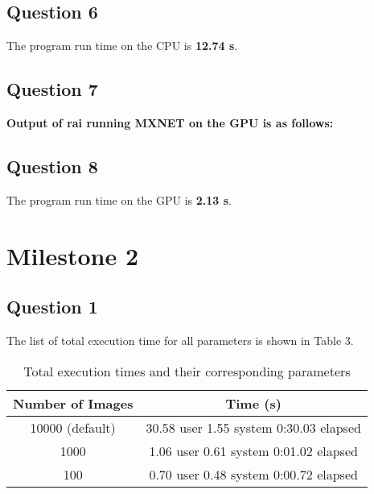 \documentclass[12pt,titlepage]{article}
\begin{document}
\subsection*{Question 6}
The program run time on the CPU is \textbf{12.74 s}.


\subsection*{Question 7}
\textbf{Output of rai running MXNET on the GPU is as follows:}\\
\noindent{}


\subsection*{Question 8}
The program run time on the GPU is \textbf{2.13 s}.

\pagebreak
\section*{Milestone 2}

\subsection*{Question 1}

The list of total execution time for all parameters is shown in Table 3.

\begin{table}[h!]
	\centering
	\begin{tabular}{||c | c ||}
		\hline
		Number of Images & Time (s)                                      \\ [0.5ex]
		\hline\hline
		10000 (default)  & 30.58 user 1.55 system 0:30.03 elapsed        \\
		1000             & 1.06 user 0.61 system 0:01.02 elapsed         \\
		100              & 0.70 user 0.48 system 0:00.72 elapsed         \\
		\hline\hline
	\end{tabular}
	\caption{Total execution times and their corresponding parameters}
\end{table}
\end{document}
